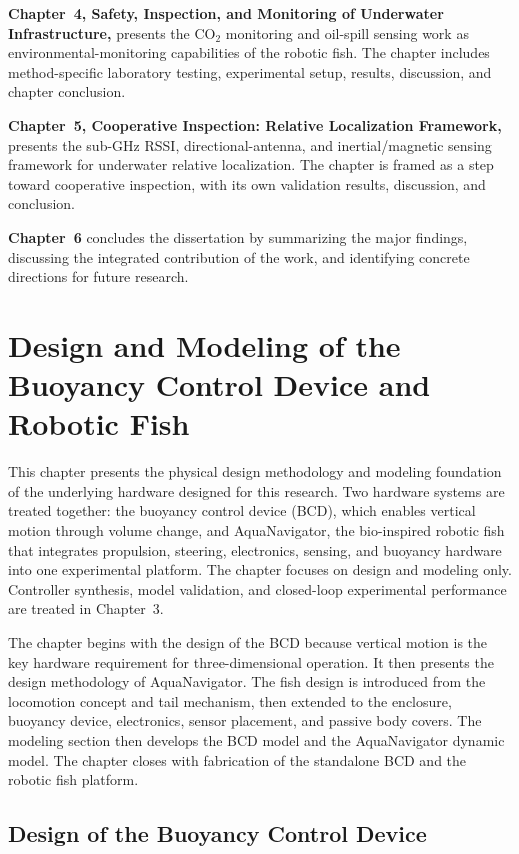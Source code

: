 \documentclass{uhcoethesis}
\begin{document}
\textbf{Chapter~4, Safety, Inspection, and Monitoring of Underwater Infrastructure,} presents the \mbox{CO$_2$} monitoring and oil-spill sensing work as environmental-monitoring capabilities of the robotic fish. The chapter includes method-specific laboratory testing, experimental setup, results, discussion, and chapter conclusion.

\textbf{Chapter~5, Cooperative Inspection: Relative Localization Framework,} presents the sub-GHz RSSI, directional-antenna, and inertial/magnetic sensing framework for underwater relative localization. The chapter is framed as a step toward cooperative inspection, with its own validation results, discussion, and conclusion.

\textbf{Chapter~6} concludes the dissertation by summarizing the major findings, discussing the integrated contribution of the work, and identifying concrete directions for future research.

\chapter{Design and Modeling of the Buoyancy Control Device and Robotic Fish}

This chapter presents the physical design methodology and modeling foundation of the underlying hardware designed for this research. Two hardware systems are treated together: the buoyancy control device (BCD), which enables vertical motion through volume change, and AquaNavigator, the bio-inspired robotic fish that integrates propulsion, steering, electronics, sensing, and buoyancy hardware into one experimental platform. The chapter focuses on design and modeling only. Controller synthesis, model validation, and closed-loop experimental performance are treated in Chapter~3.

The chapter begins with the design of the BCD because vertical motion is the key hardware requirement for three-dimensional operation. It then presents the design methodology of AquaNavigator. The fish design is introduced from the locomotion concept and tail mechanism, then extended to the enclosure, buoyancy device, electronics, sensor placement, and passive body covers. The modeling section then develops the BCD model and the AquaNavigator dynamic model. The chapter closes with fabrication of the standalone BCD and the robotic fish platform.

\section{Design of the Buoyancy Control Device}
\end{document}
